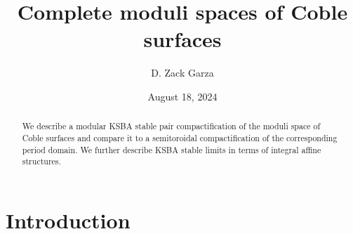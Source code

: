 \documentclass{amsart}
\title{Complete moduli spaces of Coble surfaces}
\date{August 18, 2024}
\author{D. Zack Garza}
\begin{document}
\begin{abstract}
We describe a modular KSBA stable pair compactification of the moduli space of Coble surfaces and compare it to a semitoroidal compactification of the corresponding period domain. We further describe KSBA stable limits in terms of integral affine structures.
\end{abstract}

\maketitle

\tableofcontents

\newpage

\section{Introduction}\label{introduction}
\end{document}
